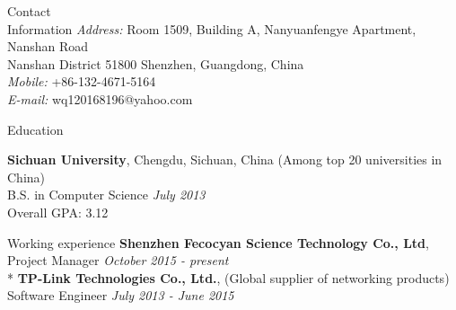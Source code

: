 \documentclass{resume} %
\begin{document}
	
\begin{rSection}{Contact\\Information}
\textit{Address:} Room 1509, Building A, Nanyuanfengye Apartment, Nanshan Road\\
Nanshan District 51800 Shenzhen, Guangdong, China\\
\textit{Mobile:} +86-132-4671-5164\\
\textit{E-mail:} wq120168196@yahoo.com
\end{rSection}


\begin{rSection}{Education}

{\bf Sichuan University}, Chengdu, Sichuan, China \hfill {(Among top 20 universities in China)} \\ 
B.S. in Computer Science \hfill {\em July 2013} \\
Overall GPA: 3.12

\end{rSection}

\begin{rSection}{Working experience}
	{\bf Shenzhen Fecocyan Science Technology Co., Ltd},\\
	Project Manager  \hfill {\em October 2015 - present}\\*	
	{\bf TP-Link Technologies Co., Ltd.}, \hfill {(Global supplier of networking products)} \\
	Software Engineer  \hfill {\em July 2013 - June 2015}
\end{rSection}

\end{document}
